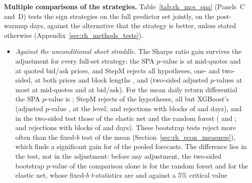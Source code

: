 \item \textbf{Multiple comparisons of the strategies.} Table~\ref{tab:rh_mcs_spa} (Panels~C and~D) tests the
  \rhmcsNAlt{} sign strategies on the full predictor set jointly, on the \rheSzDays{} post-warmup days, against the
  alternative that the strategy is better, unless stated otherwise (Appendix~\ref{sec:rh_methods_tests}).
  \begin{itemize}
  \item \emph{Against the unconditional short straddle.} The Sharpe ratio gain survives the adjustment for every
    full-set strategy: the SPA $p$-value is \rhmcsMidShortSrSpaC{} at mid-quotes and \rhmcsBaShortSrSpaC{} at quoted
    bid/ask prices, and StepM rejects all \rhmcsNAlt{} hypotheses, one- and two-sided, at both prices and block
    lengths \rhmcsBlockLo, \rhmcsBlock{} and \rhmcsBlockHi{} (two-sided adjusted $p$-values at most
    \rhmcsMidShortSrPTwoMax{} at mid-quotes and \rhmcsBaShortSrPTwoMax{} at bid/ask). For the mean daily return
    differential the SPA $p$-value is \rhmcsMidShortMeanSpaC; StepM rejects \rhmcsMidShortMeanNRej{} of the
    \rhmcsNAlt{} hypotheses, all but XGBoost's (adjusted $p$-value \rhmcsMidShortMeanPXgb, at the level;
    \rhmcsMidShortMeanNRejLo{} and \rhmcsMidShortMeanNRejHi{} rejections with blocks of \rhmcsBlockLo{} and
    \rhmcsBlockHi{} days), and in the two-sided test those of the elastic net and the random forest
    (\rhmcsMidShortMeanPTwoEnet{} and \rhmcsMidShortMeanPTwoRf; \rhmcsMidShortMeanNRejTwoLo{} and
    \rhmcsMidShortMeanNRejTwoHi{} rejections with blocks of \rhmcsBlockLo{} and \rhmcsBlockHi{} days). These bootstrap
    tests reject more often than the fixed-$b$ test of the mean (Section~\ref{sec:rh_econ_measures}), which finds a
    significant gain for \rhrPoolShortSig{} of the \rhrPoolN{} pooled forecasts. The difference lies in the test, not
    in the adjustment: before any adjustment, the two-sided bootstrap $p$-value of the comparison alone is
    \rhmcsMidShortMeanRawTwoRf{} for the random forest and \rhmcsMidShortMeanRawTwoEnet{} for the elastic net, whose
    fixed-$b$ $t$-statistics are \rhrVsShortRfPoolFullT{} and \rhrVsShortEnetPoolFullT{} against a 5\% critical value

\end{itemize}
